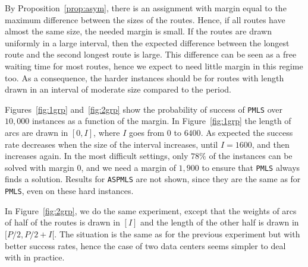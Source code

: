 \documentclass[a4paper,10pt]{journal}
\newcommand\PMLS{\texttt{PMLS}\xspace}
\newcommand\ASPMLS{\texttt{ASPMLS}\xspace}
\begin{document}
		  By Proposition~\ref{prop:asym}, there is an assignment with margin equal to the maximum difference
    between the sizes of the routes. Hence, if all routes have almost the same size, the needed margin is small. If the routes are drawn uniformly in a large interval, then the expected difference between the longest route and the second longest route is large. This difference can be seen as a free waiting time for most routes, hence we expect to need little margin in this regime too. As a consequence, the harder instances should be for routes with length drawn in an interval of moderate size compared to the period.

  	Figures~\ref{fig:1grp} and~\ref{fig:2grp} show the probability of success of \PMLS  over $10,000$ instances as a function of the margin. In Figure~\ref{fig:1grp} the length of arcs are drawn in $[0,I]$, where $I$ goes from $0$ to $6400$. As expected the success rate decreases when the size of the interval increases, until $I = 1600$, and then increases again.  In the most difficult settings, only $78\%$ of the instances can be solved with margin $0$, and we need a margin of $1,900$ to ensure that \PMLS always finds a solution. Results for \ASPMLS are not shown, since they are the same as for \PMLS, even on these hard instances.

 	In Figure~\ref{fig:2grp}, we do the same experiment, except that the weights of arcs of half of the routes is drawn in $[I]$ and the length of the other half is drawn in $[P/2,P/2 + I[$. The situation is the same as for the previous experiment but with better success rates, hence the case of two data centers seems simpler to deal with in practice.
  
\end{document}
